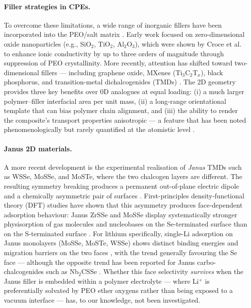 \documentclass[review, 12pt]{elsarticle}
\numberwithin{equation}{section}
\newcommand{\WSSe}{WSSe\xspace}
\begin{document}
\paragraph{Filler strategies in CPEs.} To overcome these limitations, a wide range of inorganic fillers have been incorporated into the PEO/salt matrix \cite{yang_nml_2023_fillers}. Early work focused on zero-dimensional oxide nanoparticles (e.g., SiO$_2$, TiO$_2$, Al$_2$O$_3$), which were shown by Croce et al. to enhance ionic conductivity by up to three orders of magnitude through suppression of PEO crystallinity. More recently, attention has shifted toward two-dimensional fillers --- including graphene oxide, MXenes (Ti$_3$C$_2$T$_x$), black phosphorus, and transition-metal dichalcogenides (TMDs) \cite{pan_nanoscale_adv_2019_mxene, rojaee_afm_2020_phosphorene}. The 2D geometry provides three key benefits over 0D analogues at equal loading: (i) a much larger polymer--filler interfacial area per unit mass, (ii) a long-range orientational template that can bias polymer chain alignment, and (iii) the ability to render the composite's transport properties anisotropic --- a feature that has been noted phenomenologically but rarely quantified at the atomistic level \cite{pan_nanoscale_adv_2019_mxene}.

\paragraph{Janus 2D materials.} A more recent development is the experimental realisation of \textit{Janus} TMDs such as \WSSe, MoSSe, and MoSTe, where the two chalcogen layers are different. The resulting symmetry breaking produces a permanent out-of-plane electric dipole and a chemically asymmetric pair of surfaces \cite{lu_natnano_2017_janus, zhang_acsnano_2017_janus}. First-principles density-functional theory (DFT) studies have shown that this asymmetry produces face-dependent adsorption behaviour: Janus ZrSSe and MoSSe display systematically stronger physisorption of gas molecules and nucleobases on the Se-terminated surface than on the S-terminated surface \cite{zhang_langmuir_2024_zrsse, sharma_acsanm_2026_mosse}. For lithium specifically, single-Li adsorption on Janus monolayers (MoSSe, MoSTe, WSSe) shows distinct binding energies and migration barriers on the two faces \cite{ahmad_apsusc_2023_wsse, bounbaa_est_2025_mosy}, with the trend generally favouring the Se face --- although the opposite trend has been reported for Janus carbo-chalcogenides such as Nb$_2$CSSe \cite{rivera_est_2026_nb2csse}. Whether this face selectivity \textit{survives} when the Janus filler is embedded within a polymer electrolyte --- where Li$^+$ is preferentially solvated by PEO ether oxygens rather than being exposed to a vacuum interface --- has, to our knowledge, not been investigated.
\end{document}
